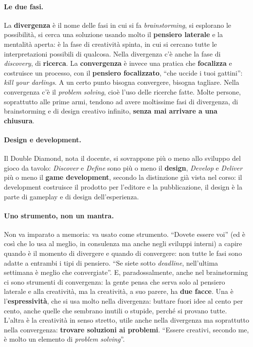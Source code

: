 \paragraph{Le due fasi.} La \textbf{divergenza} è il nome delle fasi in cui si fa
\emph{brainstorming}, si esplorano le possibilità, si cerca una soluzione usando molto il
\textbf{pensiero laterale} e la mentalità aperta: è la fase di creatività spinta, in cui
si cercano tutte le interpretazioni possibili di qualcosa. Nella divergenza c'è anche la
fase di \emph{discovery}, di \textbf{ricerca}. La \textbf{convergenza} è invece una
pratica che \textbf{focalizza} e costruisce un processo, con il \textbf{pensiero
focalizzato}, ``che uccide i tuoi gattini'': \emph{kill your darlings}. A un certo punto
bisogna convergere, bisogna tagliare. Nella convergenza c'è il \emph{problem solving},
cioè l'uso delle ricerche fatte. Molte persone, soprattutto alle prime armi, tendono ad
avere moltissime fasi di divergenza, di brainstorming e di design creativo infinito,
\textbf{senza mai arrivare a una chiusura}.

\paragraph{Design e development.} Il Double Diamond, nota il docente, si sovrappone più o
meno allo sviluppo del gioco da tavolo: \emph{Discover} e \emph{Define} sono più o meno
il \textbf{design}, \emph{Develop} e \emph{Deliver} più o meno il \textbf{game
development}, secondo la distinzione già vista nel corso: il development costruisce il
prodotto per l'editore e la pubblicazione, il design è la parte di gameplay e di design
dell'esperienza.

\paragraph{Uno strumento, non un mantra.} Non va imparato a memoria: va usato come
strumento. ``Dovete essere voi'' (ed è così che lo usa al meglio, in consulenza ma
anche negli sviluppi interni) a capire quando è il momento di divergere e quando di
convergere: non tutte le fasi sono adatte a entrambi i tipi di pensiero. ``Se siete
sotto \emph{deadline}, nell'ultima settimana è meglio che convergiate''. E,
paradossalmente, anche nel brainstorming ci sono strumenti di convergenza: la gente pensa
che serva solo al pensiero laterale e alla creatività, ma la creatività, a suo parere,
ha \textbf{due facce}. Una è l'\textbf{espressività}, che si usa molto nella divergenza:
buttare fuori idee al cento per cento, anche quelle che sembrano inutili o stupide,
perché si provano tutte. L'altra è la creatività in senso stretto, utile anche nella
divergenza ma soprattutto nella convergenza: \textbf{trovare soluzioni ai problemi}.
``Essere creativi, secondo me, è molto un elemento di \emph{problem solving}''.

